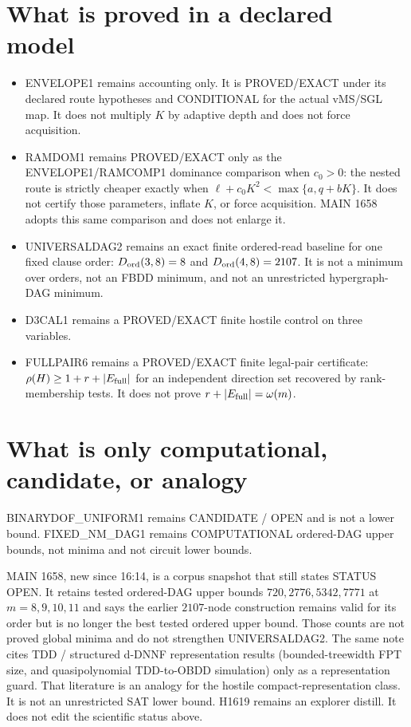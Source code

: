 \documentclass[11pt]{article}
\begin{document}
\section*{What is proved in a declared model}
\begin{itemize}
\item ENVELOPE1 remains accounting only. It is PROVED/EXACT under its declared route
hypotheses and CONDITIONAL for the actual vMS/SGL map. It does not multiply \(K\) by
adaptive depth and does not force acquisition.
\item RAMDOM1 remains PROVED/EXACT only as the ENVELOPE1/RAMCOMP1 dominance comparison
when \(c_0>0\): the nested route is strictly cheaper exactly when
\(\ell+c_0K^2<\max\{a,q+bK\}\). It does not certify those parameters, inflate \(K\),
or force acquisition. MAIN 1658 adopts this same comparison and does not enlarge it.
\item UNIVERSALDAG2 remains an exact finite ordered-read baseline for one fixed clause
order: \(D_{\rm ord}(3,8)=8\) and \(D_{\rm ord}(4,8)=2107\). It is not a minimum over
orders, not an FBDD minimum, and not an unrestricted hypergraph-DAG minimum.
\item D3CAL1 remains a PROVED/EXACT finite hostile control on three variables.
\item FULLPAIR6 remains a PROVED/EXACT finite legal-pair certificate:
\(\rho(H)\ge 1+r+|E_{\rm full}|\) for an independent direction set recovered by
rank-membership tests. It does not prove \(r+|E_{\rm full}|=\omega(m)\).
\end{itemize}

\section*{What is only computational, candidate, or analogy}
BINARYDOF\_UNIFORM1 remains CANDIDATE / OPEN and is not a lower bound.
FIXED\_NM\_DAG1 remains COMPUTATIONAL ordered-DAG upper bounds, not minima and not
circuit lower bounds.

MAIN 1658, new since 16:14, is a corpus snapshot that still states STATUS OPEN.
It retains tested ordered-DAG upper bounds \(720,2776,5342,7771\) at
\(m=8,9,10,11\) and says the earlier \(2107\)-node construction remains valid for its
order but is no longer the best tested ordered upper bound. Those counts are not proved
global minima and do not strengthen UNIVERSALDAG2.
The same note cites TDD / structured d-DNNF representation results (bounded-treewidth
FPT size, and quasipolynomial TDD-to-OBDD simulation) only as a representation guard.
That literature is an analogy for the hostile compact-representation class. It is not
an unrestricted SAT lower bound.
H1619 remains an explorer distill. It does not edit the scientific status above.
\end{document}
